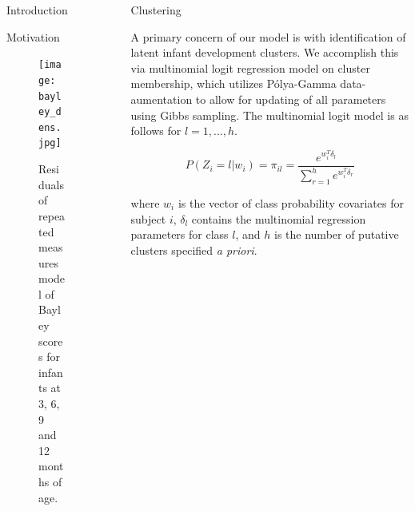 \documentclass[final]{beamer}
\newlength{\sepwid}
\newlength{\onecolwid}
\newlength{\twocolwid}
\begin{document}
\begin{frame}[t]
\begin{columns}[t]
\begin{column}{\onecolwid}
\begin{block}{Introduction}
\end{block}


\begin{block}{Motivation}
\begin{figure}
\texttt{[image: bayley\_dens.jpg]}
\caption{Residuals of repeated measures model of Bayley scores for infants at 3, 6, 9 and 12 months of age.}
\end{figure}
\end{block}


\end{column} %

\begin{column}{\sepwid}\end{column} %

\begin{column}{\twocolwid} %

\begin{columns}[t,totalwidth=\twocolwid] %

\begin{column}{\onecolwid}\vspace{-.6in} %

%	

\begin{block}{Clustering}

A primary concern of our model is with identification of latent infant development clusters. We accomplish this via multinomial logit regression model on cluster membership, which utilizes P\'{o}lya-Gamma data-aumentation to allow for updating of all parameters using Gibbs sampling. The multinomial logit model is as follows for $l = 1,...,h$.

$$P(Z_i = l|w_i) = \pi_{il} = \frac{e^{w_i^T \delta_l}}{\sum_{r = 1}^h e^{w_i^T \delta_r}}$$

where $w_i$ is the vector of class probability covariates for subject $i$, $\delta_l$ contains the multinomial regression parameters for class $l$, and $h$ is the number of putative clusters specified \textit{a priori}.


\end{block}
\end{column}
\end{columns}
\end{column}
\end{columns}
\end{frame}
\end{document}
